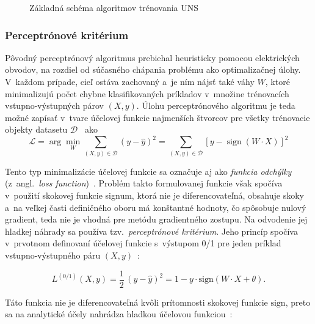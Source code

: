   \begin{figure}[b!]
    \centering
    
    \caption[Základná schéma algoritmov trénovania UNS]{Základná schéma algoritmov trénovania UNS}\label{fig:training}
  \end{figure}

  \subsubsection{Perceptrónové kritérium}
    Pôvodný perceptrónový algoritmus prebiehal heuristicky pomocou elektrických obvodov, na rozdiel od súčasného chápania problému ako optimalizačnej úlohy. V~každom prípade, cieľ ostáva zachovaný a~je ním nájsť také váhy $W$, ktoré minimalizujú počet chybne klasifikovaných príkladov v~množine trénovacích vstupno-výstupných párov $(X, y)$. Úlohu perceptrónového algoritmu je teda možné zapísať v~tvare účelovej funkcie najmenších štvorcov pre všetky trénovacie objekty datasetu $\mathcal{D}$~\cite{aggarwalNeuralNetworksDeep2018} ako
    \begin{equation}
      \mathcal{L} = \arg\min_{W} \sum_{(X, y) \in \mathcal{D}} {\left( y - \hat y \right)}^2 = \sum_{(X, y) \in \mathcal{D}} {\left[ y - \operatorname{sign}(W \cdot X) \right]}^2
    \end{equation}

    Tento typ minimalizácie účelovej funkcie sa označuje aj ako \emph{funkcia odchýlky} (z~angl.\ \emph{loss function})~\cite{aggarwalNeuralNetworksDeep2018}. Problém takto formulovanej funkcie však spočíva v~použití skokovej funkcie signum, ktorá nie je diferencovateľná, obsahuje skoky a~na veľkej časti definičného oboru má konštantné hodnoty, čo spôsobuje nulový gradient, teda nie je vhodná pre metódu gradientného zostupu. Na odvodenie jej hladkej náhrady sa používa tzv.\ \emph{perceptrónové kritérium}. Jeho princíp spočíva v~prvotnom definovaní účelovej funkcie s~výstupom 0/1 pre jeden príklad vstupno-výstupného páru $(X, y)$~\cite{aggarwalNeuralNetworksDeep2018}:

    \begin{equation}
      L^{(0/1)}(X, y) = \frac{1}{2}\,{(y - \hat{y})}^2 = 1 - y \cdot \mathrm{sign}(W \cdot X + \theta).
    \end{equation}

    Táto funkcia nie je diferencovateľná kvôli prítomnosti skokovej funkcie $\mathrm{sign}$, preto sa na analytické účely nahrádza hladkou účelovou funkciou~\cite{aggarwalNeuralNetworksDeep2018}:

